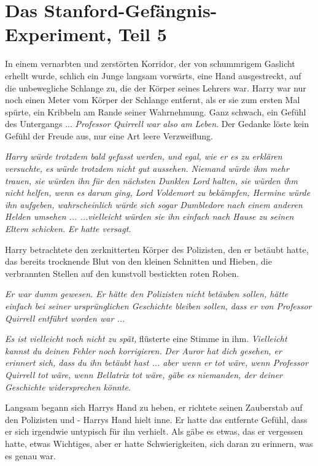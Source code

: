 \chapter{Das Stanford-Gefängnis-Experiment, Teil 5}

In einem vernarbten und zerstörten Korridor, der von schummrigem Gaslicht
erhellt wurde, schlich ein Junge langsam vorwärts, eine Hand ausgestreckt, auf
die unbewegliche Schlange zu, die der Körper seines Lehrers war. Harry war nur
noch einen Meter vom Körper der Schlange entfernt, als er sie zum ersten Mal
spürte, ein Kribbeln am Rande seiner Wahrnehmung. Ganz schwach, ein Gefühl des
Untergangs ... \emph{Professor Quirrell war also am Leben}. Der Gedanke löste
kein Gefühl der Freude aus, nur eine Art leere Verzweiflung.

\emph{Harry würde trotzdem bald gefasst werden, und egal, wie er es zu erklären
versuchte, es würde trotzdem nicht gut aussehen. Niemand würde ihm mehr trauen,
sie würden ihn für den nächsten Dunklen Lord halten, sie würden ihm nicht
helfen, wenn es darum ging, Lord Voldemort zu bekämpfen, Hermine würde ihn
aufgeben, wahrscheinlich würde sich sogar Dumbledore nach einem anderen Helden
umsehen ... ...vielleicht würden sie ihn einfach nach Hause zu seinen Eltern
schicken. Er hatte versagt.}

Harry betrachtete den zerknitterten Körper des Polizisten, den er betäubt hatte,
das bereits trocknende Blut von den kleinen Schnitten und Hieben, die
verbrannten Stellen auf den kunstvoll bestickten roten Roben.

\emph{Er war dumm gewesen. Er hätte den Polizisten nicht betäuben sollen, hätte
einfach bei seiner ursprünglichen Geschichte bleiben sollen, dass er von
Professor Quirrell entführt worden war ...}

\emph{Es ist vielleicht noch nicht zu spät,} flüsterte eine Stimme in ihm.
\emph{Vielleicht kannst du deinen Fehler noch korrigieren.} \emph{Der Auror hat
dich gesehen, er erinnert sich, dass du ihn betäubt hast ... aber wenn er tot
wäre, wenn Professor Quirrell tot wäre, wenn Bellatrix tot wäre, gäbe es
niemanden, der deiner Geschichte widersprechen könnte.}

Langsam begann sich Harrys Hand zu heben, er richtete seinen Zauberstab auf den
Polizisten und - Harrys Hand hielt inne. Er hatte das entfernte Gefühl, dass er
sich irgendwie untypisch für ihn verhielt. Als gäbe es etwas, das er vergessen
hatte, etwas Wichtiges, aber er hatte Schwierigkeiten, sich daran zu erinnern,
was es genau war.

